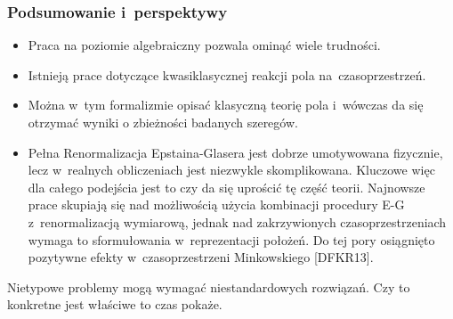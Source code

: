 \documentclass[10pt,t]{beamer}
\begin{document}
\begin{frame}
  \frametitle{Podsumowanie i~perspektywy}


  \begin{itemize}
    \RaggedRight

  \item Praca na poziomie algebraiczny pozwala ominąć wiele
    trudności.

  \item Istnieją prace dotyczące kwasiklasycznej reakcji pola
    na~czasoprzestrzeń.

  \item Można w~tym formalizmie opisać klasyczną teorię pola
    i~wówczas da się otrzymać wyniki o zbieżności badanych
    szeregów.

  \item Pełna Renormalizacja Epstaina-Glasera jest dobrze umotywowana
    fizycznie, lecz w~realnych obliczeniach jest niezwykle skomplikowana.
    Kluczowe więc dla całego podejścia jest to czy da się uprościć tę
    część teorii. Najnowsze prace skupiają się nad możliwością użycia
    kombinacji procedury E-G z~renormalizacją wymiarową, jednak nad
    zakrzywionych czasoprzestrzeniach wymaga to sformułowania
    w~reprezentacji położeń. Do tej pory osiągnięto pozytywne efekty
    w~czasoprzestrzeni Minkowskiego [DFKR13].

  \end{itemize}

\end{frame}





\begin{frame}[standout]


  { \color{jFrametitleFGColor} Nietypowe problemy mogą wymagać
    niestandardowych rozwiązań. Czy to konkretne jest właściwe to czas
    pokaże. }

\end{frame}










\end{document}
